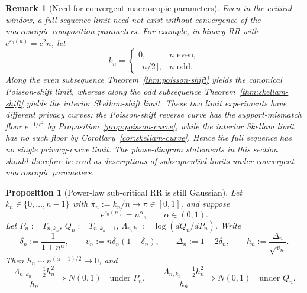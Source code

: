 \documentclass{article}
\newtheorem{proposition}[theorem]{Proposition}
\newtheorem{remark}[theorem]{Remark}
\begin{document}
\begin{remark}[Need for convergent macroscopic parameters]
Even in the critical window, a full-sequence limit need not exist without convergence of the macroscopic
composition parameters. For example, in binary RR with $e^{\varepsilon_0(n)} = c^2 n$, let
\[
k_n=
\begin{cases}
0, & n \text{ even},\\
\lfloor n/2\rfloor, & n \text{ odd}.
\end{cases}
\]
Along the even subsequence Theorem~\ref{thm:poisson-shift} yields the canonical Poisson-shift limit,
whereas along the odd subsequence Theorem~\ref{thm:skellam-shift} yields the interior Skellam-shift limit.
These two limit experiments have different privacy curves: the Poisson-shift reverse curve has the
support-mismatch floor $e^{-1/c^2}$ by Proposition~\ref{prop:poisson-curve}, while the interior
Skellam limit has no such floor by Corollary~\ref{cor:skellam-curve}. Hence the full sequence has no
single privacy-curve limit. The phase-diagram statements in this section should therefore be read as
descriptions of subsequential limits under convergent macroscopic parameters.
\end{remark}

\begin{proposition}[Power-law sub-critical RR is still Gaussian]
\label{prop:power-law-gaussian}
Let $k_n\in\{0,\dots,n-1\}$ with $\pi_n:=k_n/n\to\pi\in[0,1]$, and suppose
\[
e^{\varepsilon_0(n)}=n^\alpha,
\qquad
\alpha\in(0,1).
\]
Let $P_n:=T_{n,k_n}$, $Q_n:=T_{n,k_n+1}$, $\Lambda_{n,k_n}:=\log(dQ_n/dP_n)$. Write
\[
\delta_n:=\frac{1}{1+n^\alpha},
\qquad
v_n:=n\delta_n(1-\delta_n),
\qquad
\Delta_n:=1-2\delta_n,
\qquad
h_n:=\frac{\Delta_n}{\sqrt{v_n}}.
\]
Then $h_n\sim n^{(\alpha-1)/2}\to 0$, and
\[
\frac{\Lambda_{n,k_n}+\frac12 h_n^2}{h_n}\Longrightarrow N(0,1)
\quad\text{under }P_n,
\qquad
\frac{\Lambda_{n,k_n}-\frac12 h_n^2}{h_n}\Longrightarrow N(0,1)
\quad\text{under }Q_n.
\]
\end{proposition}
\end{document}
